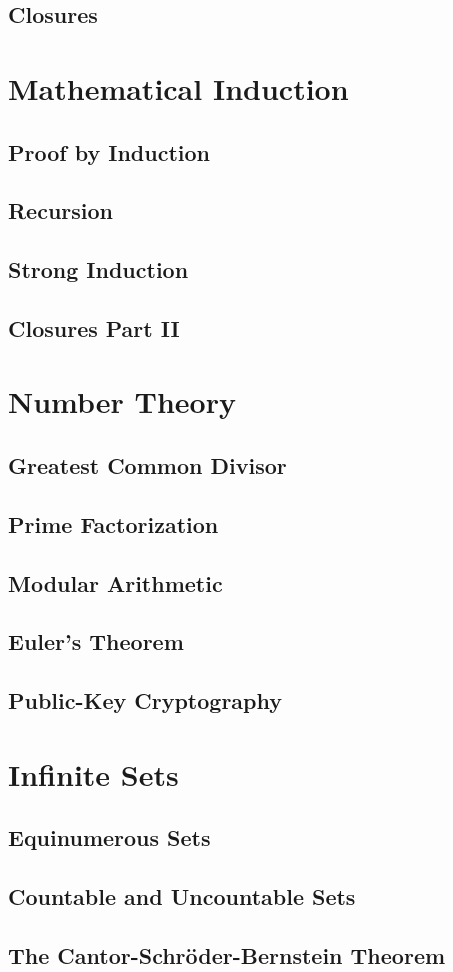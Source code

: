 \documentclass{article}
\begin{document}
\subsection{Closures}

\section{Mathematical Induction}
\subsection{Proof by Induction}
\subsection{Recursion}
\subsection{Strong Induction}
\subsection{Closures Part II}

\section{Number Theory}
\subsection{Greatest Common Divisor}
\subsection{Prime Factorization}
\subsection{Modular Arithmetic}
\subsection{Euler's Theorem}
\subsection{Public-Key Cryptography}

\section{Infinite Sets}
\subsection{Equinumerous Sets}
\subsection{Countable and Uncountable Sets}
\subsection{The Cantor-Schröder-Bernstein Theorem}
\end{document}

